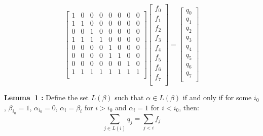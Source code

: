 \documentclass[twoside]{article}
\begin{document}
\begin{equation}        
        \begin{bmatrix}
                1 & 0 & 0 & 0 & 0 & 0 & 0 & 0 \\
                1 & 1 & 0 & 0 & 0 & 0 & 0 & 0 \\
                0 & 0 & 1 & 0 & 0 & 0 & 0 & 0 \\
                1 & 1 & 1 & 1 & 0 & 0 & 0 & 0 \\
                0 & 0 & 0 & 0 & 1 & 0 & 0 & 0 \\
                0 & 0 & 0 & 0 & 1 & 1 & 0 & 0 \\
                0 & 0 & 0 & 0 & 0 & 0 & 1 & 0 \\
                1 & 1 & 1 & 1 & 1 & 1 & 1 & 1 \\
        \end{bmatrix}        
        \begin{bmatrix}
                f_0 \\
                f_1 \\
                f_2 \\
                f_3 \\
                f_4 \\
                f_5 \\
                f_6 \\
                f_7 \\
        \end{bmatrix}
        = \begin{bmatrix}
                q_0 \\
                q_1 \\
                q_2 \\
                q_3 \\
                q_4 \\
                q_5 \\
                q_6 \\
                q_7 \\
        \end{bmatrix}
\end{equation}

\vspace*{12pt}
\noindent
{\bf Lemma~1 \cite{bravyikitaev}:} Define the set $L(\beta)$ such that $\alpha \in L(\beta)$ if and only if for some $i_0$, $\beta_{i_0} = 1$, $\alpha_{i_0} = 0$, $\alpha_i = \beta_i$ for $i> i_0$ and $\alpha_i = 1$ for $i< i_0$, then:
\begin{equation}
        \sum_{j \in L(i)} q_j = \sum_{j < i} f_j
\end{equation}
\vspace*{12pt}
\end{document}
